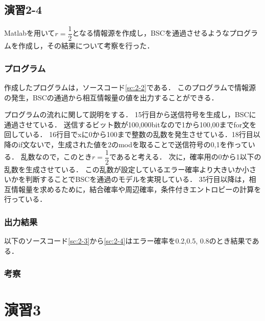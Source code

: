 \documentclass[documentclass]{jsarticle}
\begin{document}
\subsection*{演習2-4}
Matlabを用いて$r = \dfrac{1}{2}$となる情報源を作成し，BSCを通過させるようなプログラムを作成し，その結果について考察を行った．

\subsubsection*{プログラム}
作成したプログラムは，ソースコード\ref*{sc:2-2}である．
このプログラムで情報源の発生，BSCの通過から相互情報量の値を出力することができる．

プログラムの流れに関して説明をする．
15行目から送信符号を生成し，BSCに通過させている．
送信するビット数が100,000bitなので1から100,00までfor文を回している．
16行目でxに0から100まで整数の乱数を発生させている．18行目以降のif文ないで，生成された値を2のmodを取ることで送信符号の0,1を作っている．
乱数なので，このとき$r = \dfrac{1}{2}$であると考える．
次に，確率用の0から1以下の乱数を生成させている．
この乱数が設定しているエラー確率より大きいか小さいかを判断することでBSCを通過のモデルを実現している．
35行目以降は，相互情報量を求めるために，結合確率や周辺確率，条件付きエントロピーの計算を行っている．



\subsubsection*{出力結果}
以下のソースコード\ref*{sc:2-3}から\ref*{sc:2-4}はエラー確率を0.2,0.5, 0.8のとき結果である．





\subsubsection*{考察}

\newpage

\section*{演習3}
\end{document}
